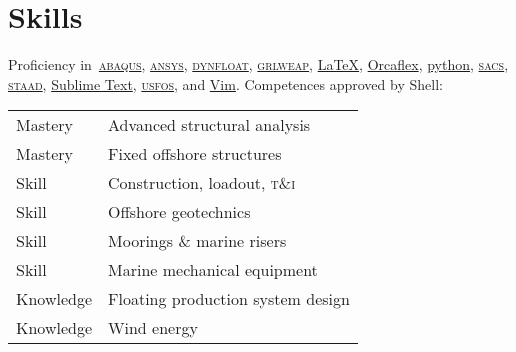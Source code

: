 \section*{Skills} %
\label{sec:comp}

Proficiency in~\href{https://www.3ds.com/products-services/simulia/products/abaqus/}{\textsc{abaqus}}, \href{https://www.ansys.com/products/structures}{\textsc{ansys}}, \href{https://www.marin.nl/nl/about/facilities-and-tools/software}{\textsc{dynfloat}}, \href{https://www.pile.com/products/grlweap/}{\textsc{grlweap}}, \href{https://www.latex-project.org}{\LaTeX}, \href{https://www.orcina.com/orcaflex/}{Orcaflex}, \href{https://www.python.org}{python}, \href{https://www.bentley.com/software/sacs-offshore-structure/}{\textsc{sacs}}, \href{https://www.bentley.com/software/staad/}{\textsc{staad}}, \href{https://www.sublimetext.com}{Sublime Text}, \href{https://www.usfos.com}{\textsc{usfos}}, and \href{https://neovim.io}{Vim}. Competences approved by Shell:

\noindent\begin{tabular}{l l}
  Mastery & Advanced structural analysis \\
  Mastery & Fixed offshore structures \\
  Skill & Construction, loadout, \textsc{t\&i} \\
  Skill & Offshore geotechnics \\
  Skill & Moorings \& marine risers \\
  Skill & Marine mechanical equipment \\
  Knowledge & Floating production system design \\
  Knowledge & Wind energy \\
\end{tabular}

